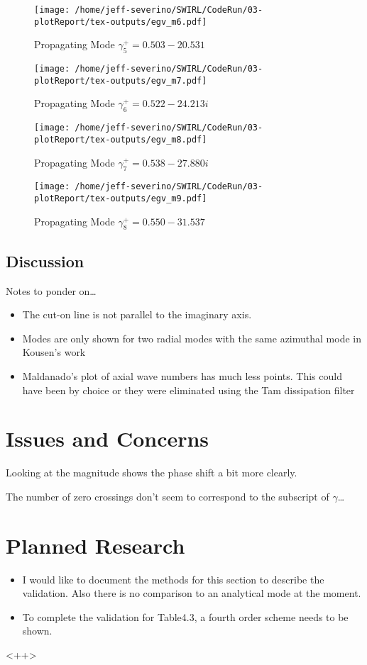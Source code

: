 \documentclass[a4paper]{article}
\begin{document}
 \begin{figure}
     \centering
     \texttt{[image: /home/jeff-severino/SWIRL/CodeRun/03-plotReport/tex-outputs/egv\_m6.pdf]}
     \caption{Propagating Mode $\gamma^+_5 = 0.503 - 20.531$}
     \label{fig:16} 
 \end{figure}


 \begin{figure}
     \centering
     \texttt{[image: /home/jeff-severino/SWIRL/CodeRun/03-plotReport/tex-outputs/egv\_m7.pdf]}
     \caption{Propagating Mode $\gamma^+_6 = 0.522 - 24.213i$}
     \label{fig:17} 
 \end{figure}

 \begin{figure}
     \centering
     \texttt{[image: /home/jeff-severino/SWIRL/CodeRun/03-plotReport/tex-outputs/egv\_m8.pdf]}
     \caption{Propagating Mode $\gamma^+_7 = 0.538 - 27.880i$}
     \label{fig:18} 
 \end{figure}


 \begin{figure}
     \centering
     \texttt{[image: /home/jeff-severino/SWIRL/CodeRun/03-plotReport/tex-outputs/egv\_m9.pdf]}
     \caption{Propagating Mode $\gamma^+_8 = 0.550 - 31.537$}
     \label{fig:19} 
 \end{figure}

\subsection{Discussion} 

Notes to ponder on\dots
\begin{itemize}
    \item The cut-on line is not parallel to the imaginary axis.
    \item Modes are only shown for two radial modes with the same azimuthal mode 
        in Kousen's work
    \item Maldanado's plot of axial wave numbers has much less points. This could
        have been by choice or they were eliminated using the Tam dissipation
        filter
\end{itemize}

\section{Issues and Concerns}
Looking at the magnitude shows the phase shift a bit more clearly. 

The number of zero crossings don't seem to correspond to the subscript of 
$\gamma$\ldots 

\section{Planned Research}
\begin{itemize}
    \item I would like to document the methods for this section to describe 
        the validation. Also there is no comparison to an analytical mode at the moment.
    \item To complete the validation for Table4.3, a fourth order scheme needs to be 
        shown. 
\end{itemize}<++>
\end{document}
